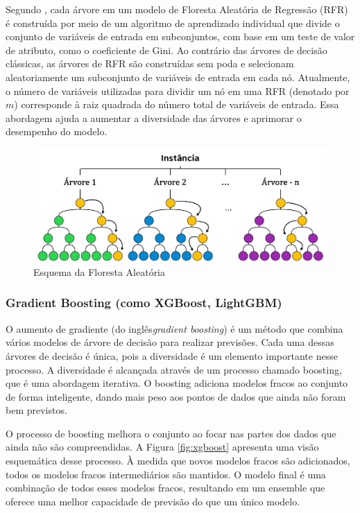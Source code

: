Segundo , cada árvore em um modelo de Floresta Aleatória de Regressão (RFR) é construída por meio de um algoritmo de aprendizado individual que divide o conjunto de variáveis de entrada em subconjuntos, com base em um teste de valor de atributo, como o coeficiente de Gini. Ao contrário das árvores de decisão clássicas, as árvores de RFR são construídas sem poda e selecionam aleatoriamente um subconjunto de variáveis de entrada em cada nó. Atualmente, o número de variáveis utilizadas para dividir um nó em uma RFR (denotado por $m$) corresponde à raiz quadrada do número total de variáveis de entrada. Essa abordagem ajuda a aumentar a diversidade das árvores e aprimorar o desempenho do modelo.

\begin{figure}[H]
	\centering
	\caption{Esquema da Floresta Aleatória}
	\label{fig:rf}
	\includegraphics[width=1\linewidth]{Modelos/Figuras/RF}
	
\end{figure}


\subsubsection{Gradient Boosting (como XGBoost, LightGBM)}\label{subsubsec:lgbxgb}

O aumento de gradiente (do inglês\textit{gradient boosting}) é um método que combina vários modelos de árvore de decisão para realizar previsões. Cada uma dessas árvores de decisão é única, pois a diversidade é um elemento importante nesse processo. A diversidade é alcançada através de um processo chamado boosting, que é uma abordagem iterativa. O boosting adiciona modelos fracos ao conjunto de forma inteligente, dando mais peso aos pontos de dados que ainda não foram bem previstos. 

O processo de boosting melhora o conjunto ao focar nas partes dos dados que ainda não são compreendidas. A Figura \ref{fig:xgboost} apresenta uma visão esquemática desse processo. À medida que novos modelos fracos são adicionados, todos os modelos fracos intermediários são mantidos. O modelo final é uma combinação de todos esses modelos fracos, resultando em um ensemble que oferece uma melhor capacidade de previsão do que um único modelo.

